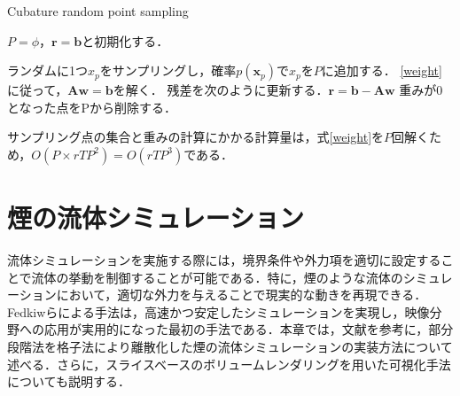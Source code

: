 \documentclass[a4j,12pt]{jreport}
\begin{document}
\begin{algorithm}[H]
    	\caption{Cubature random point sampling}
	\label{alg1}
        	\begin{algorithmic}[1]
		\STATE $P = \phi$，$\bm{r} = \bm{b}$と初期化する．                
		
			\STATE ランダムに1つ$x_p$をサンプリングし，確率$p(\bm{x}_p)$で$x_p$を$P$に追加する．
			\STATE \ref{weight}に従って，$\bm{A}\bm{w} = \bm{b}$を解く．
			\STATE 残差を次のように更新する．$\bm{r} = \bm{b} - \bm{A}\bm{w}$
			\STATE 重みが0となった点をPから削除する．
		\ENDWHILE
        \end{algorithmic}
\end{algorithm}

サンプリング点の集合と重みの計算にかかる計算量は，式\ref{weight}を$P$回解くため，$O(P\times rTP^2) = O(rTP^3)$である．
\chapter{煙の流体シミュレーション}
流体シミュレーションを実施する際には，境界条件や外力項を適切に設定することで流体の挙動を制御することが可能である．特に，煙のような流体のシミュレーションにおいて，適切な外力を与えることで現実的な動きを再現できる．Fedkiwらによる手法\cite{fedkiw}は，高速かつ安定したシミュレーションを実現し，映像分野への応用が実用的になった最初の手法である．本章では，文献\cite{fedkiw}を参考に，部分段階法を格子法により離散化した煙の流体シミュレーションの実装方法について述べる．さらに，スライスベースのボリュームレンダリングを用いた可視化手法についても説明する．%
\end{document}
